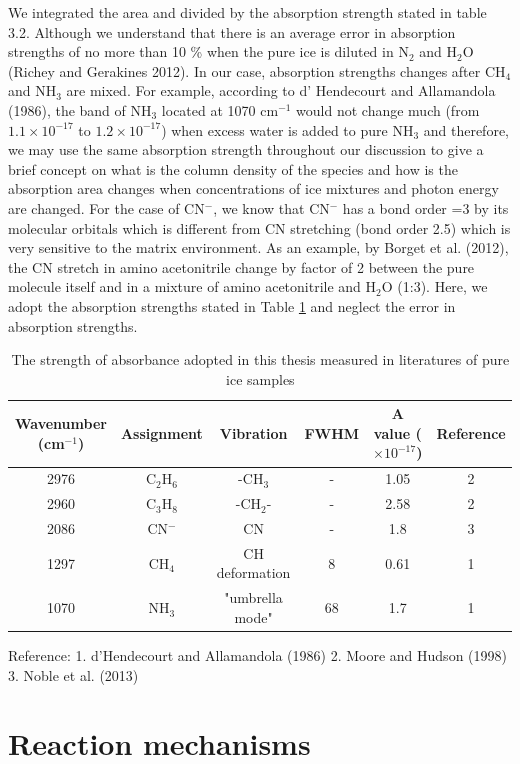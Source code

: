 We integrated the area and divided by the absorption strength stated in table 3.2. Although we understand that there is an average error in absorption strengths of no more than 10 \%  when the pure ice is diluted in N$_2$ and H$_2$O (Richey and Gerakines 2012). In our case, absorption strengths changes after CH$_4$ and NH$_3$ are mixed. For example, according to d' Hendecourt and Allamandola (1986), the band of NH$_3$ located at 1070 cm$^{-1}$ would not change much (from $1.1 \times 10^{-17}$ to $1.2 \times 10^{-17}$) when excess water is added to pure NH$_3$ and therefore, we may use the same absorption strength throughout our discussion to give a brief concept on what is the column density of the species and how is the absorption area changes when concentrations of ice mixtures and photon energy are changed. For the case of CN$^-$, we know that CN$^-$ has a bond order =3 by its molecular orbitals which is different from CN stretching (bond order 2.5) which is very sensitive to the matrix environment. As an example, by Borget et al. (2012), the CN stretch in amino acetonitrile change by factor of 2 between the pure molecule itself and in a mixture of amino acetonitrile and H$_2$O (1:3). Here, we adopt the absorption strengths stated in Table \ref{tab:Absorbance} and neglect the error in absorption strengths.\\

\begin{table}[htbp]
\caption{The strength of absorbance adopted in this thesis measured in literatures of pure ice samples}
\label{tab:Absorbance}
\begin{tabular}{cccccc}
\hline
\hline
Wavenumber (cm$^{-1}$) & Assignment  & Vibration & FWHM & A value ($\times 10^{-17}$) & Reference \\
\hline
2976 &  C$_2$H$_6$ & -CH$_3$ & - & 1.05 & 2 \\
2960 & C$_3$H$_8$ & -CH$_2$- & - & 2.58 & 2 \\
2086 & CN$^-$ & CN & - & 1.8 & 3 \\
1297 & CH$_4$ & CH deformation & 8 & 0.61 & 1 \\
1070 & NH$_3$ & "umbrella mode" & 68 & 1.7 & 1 \\
\hline
\end{tabular}
Reference: 1. d'Hendecourt and Allamandola (1986) 2. Moore and Hudson (1998) 3. Noble et al. (2013)
\end{table}

\section{Reaction mechanisms}

